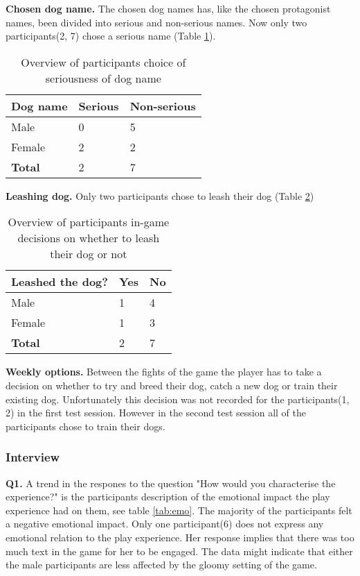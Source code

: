 \textbf{Chosen dog name.} The chosen dog names has, like the chosen protagonist names, been divided into serious and non-serious names. Now only two participants(2, 7) chose a serious name (Table \ref{tab:dame}). 

\begin{table}[h]
\centering
\begin{tabular}{l l l}
\hline
\textbf{Dog name} & Serious & Non-serious \\
\hline
Male & 0 & 5 \\
Female & 2 & 2 \\
\textbf{Total} & 2 & 7 \\
\hline
\end{tabular}
\caption{\label{tab:dame}Overview of participants choice of seriousness of dog name}
\end{table}


\textbf{Leashing dog.} Only two participants chose to leash their dog (Table \ref{tab:leas})

\begin{table}[h]
\centering
\begin{tabular}{l l l}
\hline
\textbf{Leashed the dog?} & Yes & No \\
\hline
Male & 1 & 4 \\
Female & 1 & 3 \\
\textbf{Total} & 2 & 7 \\
\hline
\end{tabular}
\caption{\label{tab:leas}Overview of participants in-game decisions on whether to leash their dog or not}
\end{table}


\textbf{Weekly options.} Between the fights of the game the player has to take a decision on whether to try and breed their dog, catch a new dog or train their existing dog. Unfortunately this decision was not recorded for the participants(1, 2) in the first test session. However in the second test session all of the participants chose to train their dogs.


\subsubsection{Interview}
\textbf{Q1.} A trend in the respones to the question "How would you characterise the experience?" is the participants description of the emotional impact the play experience had on them, see table \ref{tab:emo}. The majority of the participants felt a negative emotional impact. Only one participant(6) does not express any emotional relation to the play experience. Her response implies that there was too much text in the game for her to be engaged. The data might indicate that either the male participants are less affected by the gloomy setting of the game.

